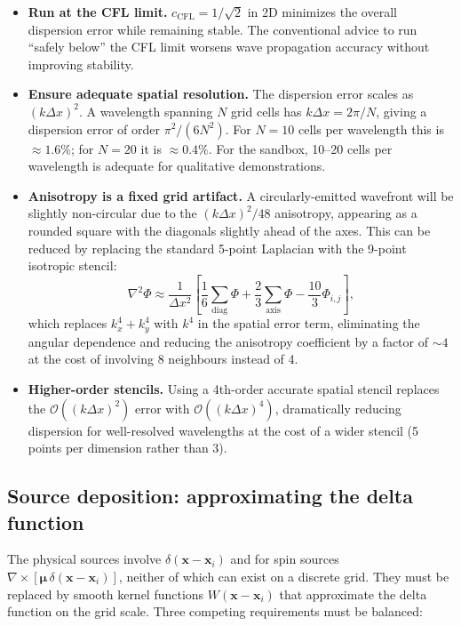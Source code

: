 \documentclass[11pt,a4paper]{article}
\newcommand{\vv}[1]{\mathbf{#1}}
\newcommand{\order}[1]{\mathcal{O}(#1)}
\begin{document}
\begin{itemize}
  \item \textbf{Run at the CFL limit.} $c_{\mathrm{CFL}} = 1/\sqrt{2}$ in 2D minimizes the overall dispersion error while remaining stable.  The conventional advice to run ``safely below'' the CFL limit worsens wave propagation accuracy without improving stability.
  \item \textbf{Ensure adequate spatial resolution.}  The dispersion error scales as $(k\Delta x)^2$.  A wavelength spanning $N$ grid cells has $k\Delta x = 2\pi/N$, giving a dispersion error of order $\pi^2/(6N^2)$.  For $N=10$ cells per wavelength this is $\approx 1.6\%$; for $N=20$ it is $\approx 0.4\%$.  For the sandbox, 10--20 cells per wavelength is adequate for qualitative demonstrations.
  \item \textbf{Anisotropy is a fixed grid artifact.}  A circularly-emitted wavefront will be slightly non-circular due to the $(k\Delta x)^2/48$ anisotropy, appearing as a rounded square with the diagonals slightly ahead of the axes.  This can be reduced by replacing the standard 5-point Laplacian with the 9-point isotropic stencil:
  \begin{equation}
    \nabla^2\Phi \approx \frac{1}{\Delta x^2}\!\left[\frac{1}{6}\sum_{\mathrm{diag}}\Phi + \frac{2}{3}\sum_{\mathrm{axis}}\Phi - \frac{10}{3}\Phi_{i,j}\right],
  \end{equation}
  which replaces $k_x^4+k_y^4$ with $k^4$ in the spatial error term, eliminating the angular dependence and reducing the anisotropy coefficient by a factor of $\sim\!4$ at the cost of involving 8 neighbours instead of 4.
  \item \textbf{Higher-order stencils.}  Using a 4th-order accurate spatial stencil replaces the $\order{(k\Delta x)^2}$ error with $\order{(k\Delta x)^4}$, dramatically reducing dispersion for well-resolved wavelengths at the cost of a wider stencil (5 points per dimension rather than 3).
\end{itemize}

\subsection{Source deposition: approximating the delta function}
\label{sec:deposition}

The physical sources involve $\delta(\vv{x}-\vv{x}_i)$ and for spin sources $\nabla\times[\boldsymbol{\mu}\,\delta(\vv{x}-\vv{x}_i)]$, neither of which can exist on a discrete grid.  They must be replaced by smooth kernel functions $W(\vv{x}-\vv{x}_i)$ that approximate the delta function on the grid scale.  Three competing requirements must be balanced:
\end{document}
